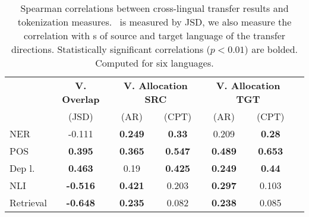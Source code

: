 \begin{table*}
\centering
\begin{tabular}{lcccccc}
\toprule
 & \bf{V. Overlap} & \multicolumn{2}{c}{\bf{V. Allocation SRC}}  & \multicolumn{2}{c}{\bf{V. Allocation TGT}} \\ 
 & (JSD) &  (AR)  &  (CPT) & (AR) & (CPT) \\ \midrule
NER     &    -0.111 &       \bf{0.249} &  \bf{ 0.33} &        0.209 &   \bf{0.28} \\
POS     &   \bf{0.395} &       \bf{0.365} &  \bf{0.547} &       \bf{0.489} &  \bf{0.653} \\
Dep l.  &   \bf{0.463} &         0.19 &  \bf{0.425} &       \bf{0.249} &   \bf{0.44} \\
NLI    &  \bf{-0.516} &       \bf{0.421} &   0.203 &       \bf{0.297} &    0.103 \\
Retrieval &  \bf{-0.648} &       \bf{0.235} &    0.082 &       \bf{0.238} &    0.085 \\
\bottomrule
\end{tabular}
\caption{Spearman correlations between cross-lingual transfer results and tokenization measures. \vo~is measured by JSD, we also measure the correlation with \va s of source and target language of the transfer directions. Statistically significant correlations ($p<0.01$) are bolded. Computed for six languages.}
\label{tab:corr_x_lang_6l}
\end{table*}
